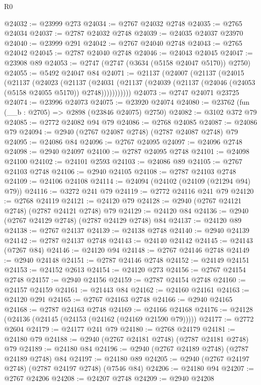 \begin{lexlean}{R0}
\begin{coremodule}
@24032 := @23999 @273
@24034 := @2767 @24032 @2748
@24035 := @2765 @24034
@24037 := @2787 @24032 @2748
@24039 := @24035 @24037 @23970
@24040 := @23999 @291
@24042 := @2767 @24040 @2748
@24043 := @2765 @24042
@24045 := @2787 @24040 @2748
@24046 := @24043 @24045
@24047 := @23908 @89
@24053 := @2747 (@2747 (@3634 (@5158 @24047 @5170)) @2750)
@24055 := @5492 @24047 @84
@24071 := @21137
    (@24007
      (@21137
        (@24015
          (@21137
            (@24023
              (@21137
                (@24031
                  (@21137 (@24039 (@21137 (@24046 (@24053 (@5158 @24055 @5170)) @2748)))))))))))
@24073 := @2747 @24071 @23725
@24074 := @23996 @24073
@24075 := @23920 @24074
@24080 := @23762 (fun (__b : @2705) => @2898 (@23846 @24075) @2750)
@24082 := @3102 @372 @79
@24085 := @2772 @24082 @94 @79
@24086 := @2768 @24085
@24087 := @24086 @79
@24094 := @2940 (@2767 @24087 @2748) (@2787 @24087 @2748) @79
@24095 := @24086 @84
@24096 := @2767 @24095
@24097 := @24096 @2748
@24098 := @2940 @24097
@24100 := @2787 @24095 @2748
@24101 := @24098 @24100
@24102 := @24101 @2593
@24103 := @24086 @89
@24105 := @2767 @24103 @2748
@24106 := @2940 @24105
@24108 := @2787 @24103 @2748
@24109 := @24106 @24108
@24114 := @24094 (@24102 (@24109 (@21294 @94) @79))
@24116 := @3272 @241 @79
@24119 := @2772 @24116 @241 @79
@24120 := @2768 @24119
@24121 := @24120 @79
@24128 := @2940 (@2767 @24121 @2748) (@2787 @24121 @2748) @79
@24129 := @24120 @84
@24136 := @2940 (@2767 @24129 @2748) (@2787 @24129 @2748) @84
@24137 := @24120 @89
@24138 := @2767 @24137
@24139 := @24138 @2748
@24140 := @2940 @24139
@24142 := @2787 @24137 @2748
@24143 := @24140 @24142
@24145 := @24143 (@7267 @84)
@24146 := @24120 @94
@24148 := @2767 @24146 @2748
@24149 := @2940 @24148
@24151 := @2787 @24146 @2748
@24152 := @24149 @24151
@24153 := @24152 @2613
@24154 := @24120 @273
@24156 := @2767 @24154 @2748
@24157 := @2940 @24156
@24159 := @2787 @24154 @2748
@24160 := @24157 @24159
@24161 := @21443 @84
@24162 := @24160 @24161
@24163 := @24120 @291
@24165 := @2767 @24163 @2748
@24166 := @2940 @24165
@24168 := @2787 @24163 @2748
@24169 := @24166 @24168
@24176 := @24128 (@24136 (@24145 (@24153 (@24162 (@24169 @21590 @79)))))
@24177 := @2772 @2604
@24179 := @24177 @241 @79
@24180 := @2768 @24179
@24181 := @24180 @79
@24188 := @2940 (@2767 @24181 @2748) (@2787 @24181 @2748) @79
@24189 := @24180 @84
@24196 := @2940 (@2767 @24189 @2748) (@2787 @24189 @2748) @84
@24197 := @24180 @89
@24205 := @2940 (@2767 @24197 @2748) (@2787 @24197 @2748) (@7546 @84)
@24206 := @24180 @94
@24207 := @2767 @24206
@24208 := @24207 @2748
@24209 := @2940 @24208

\end{coremodule}
\end{lexlean}
